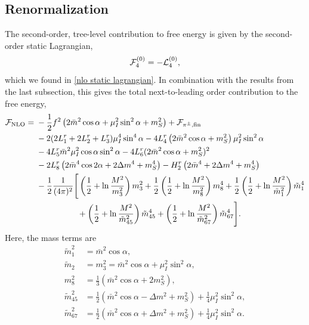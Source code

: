 \subsection{Renormalization}

The second-order, tree-level contribution to free energy is given by the second-order static Lagrangian,
%
\begin{equation}
    \mathcal{F}^{(0)}_4 = - \mathcal{L}_4^{(0)},
\end{equation}
%
which we found in \autoref{nlo static lagrangian}.
In combination with the results from the last subsection, this gives the total next-to-leading order contribution to the free energy,
%
\begingroup
\allowdisplaybreaks
\begin{align}
    \nonumber
    \mathcal{F}_{\text{NLO}}
    ={}&
    -\frac{1}{2} f^2 
    \left( 2 \bar m^2 \cos\alpha + \mu_I^2 \sin^2\alpha + m_S^2\right)
    + \mathcal{F}_{{\pi^\pm},\text{fin}} 
    \\ \nonumber&
    -2(2L_1^r + 2L_2^r + L_3^r) \mu_I^4 \sin^4\alpha
    - 4  L_4^r \left( 2 \bar m^2 \cos\alpha + m_S^2 \right) \mu_I^2\sin^2\alpha
    \\ \nonumber& 
    - 4 L_5^r \bar m^2 \mu_I^2 \cos\alpha \sin^2 \alpha 
    - 4 L_6^r (2\bar m^2\cos\alpha + m_S^2)^2
    \\ \nonumber& 
    - 2 L_8^r \left(2 \bar m^4 \cos2\alpha + 2 \Delta m^4 + m_S^4\right)
    - H_2^r \left(2\bar m^4 + 2\Delta m^4 + m_S^4 \right) \\\nonumber
    & - \frac{1}{2} \frac{1}{(4 \pi)^2}  
    \Bigg[
        \left(
            \frac{1}{2} + \ln\frac{M^2}{m_3^2}
        \right)
        m_3^2
        + 
        \frac{1}{2}
        \left(
            \frac{1}{2} + \ln\frac{M^2}{m_8^2} 
        \right)
        m_8^4
        +
        \frac{1}{2}
        \left(
            \frac{1}{2} + \ln\frac{M^2}{\tilde m_1^2}
        \right)
        \tilde m_1^4
        \\ & \quad\quad\quad\quad\quad
        +
        \left(
            \frac{1}{2} + \ln\frac{M^2}{\tilde m_{45}^2}
        \right)
        \tilde m_{45}^4
        +
        \left(
            \frac{1}{2} + \ln\frac{M^2}{\tilde m_{67}^2} 
        \right)
        \tilde m_{67}^4
    \Bigg].
\end{align}
\endgroup
%
Here, the mass terms are
%
\begingroup
\allowdisplaybreaks
\begin{align}
    \tilde m_1^2 
    & =
    \bar m^2 \cos\alpha ,\\
    \tilde m_2 &= m_3^2 = \bar m^2 \cos\alpha + \mu_I^2 \sin^2\alpha ,\\
    m_8^2 & = \frac{1}{3} (\bar m^2 \cos\alpha + 2m_S^2) ,\\
    \tilde m_{45}^2 & 
    = \frac{1}{2}(\bar m^2 \cos \alpha - \Delta m^2 + m_S^2)
    + \frac{1}{4} \mu_I^2\sin^2\alpha ,\\
    \tilde m_{67}^2 & 
    = \frac{1}{2}(\bar m^2 \cos \alpha + \Delta m^2 + m_S^2)
    + \frac{1}{4} \mu_I^2\sin^2\alpha.
\end{align}
